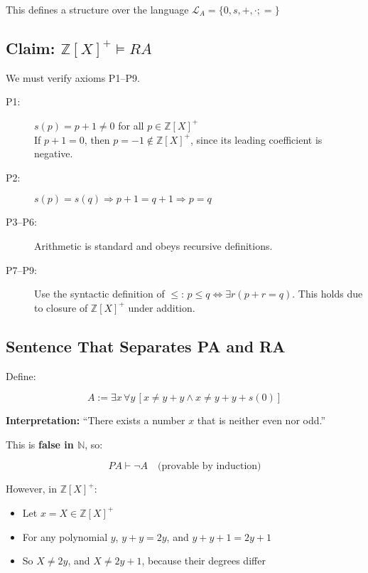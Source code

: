 \documentclass[12pt]{article}
\begin{document}
This defines a structure over the language \( \mathcal{L}_A = \{0, s, +, \cdot; =\} \)

\subsection{Claim: \( \mathbb{Z}[X]^+ \models RA \)}

We must verify axioms P1–P9.

\begin{description}
  \item[P1:] \( s(p) = p + 1 \neq 0 \) for all \( p \in \mathbb{Z}[X]^+ \) \\
  If \( p + 1 = 0 \), then \( p = -1 \notin \mathbb{Z}[X]^+ \), since its leading coefficient is negative.

  \item[P2:] \( s(p) = s(q) \Rightarrow p + 1 = q + 1 \Rightarrow p = q \)

  \item[P3–P6:] Arithmetic is standard and obeys recursive definitions.

  \item[P7–P9:] Use the syntactic definition of \( \leq \): \( p \leq q \iff \exists r(p + r = q) \). This holds due to closure of \( \mathbb{Z}[X]^+ \) under addition.
\end{description}

\subsection{Sentence That Separates PA and RA}

Define:

\[
A := \exists x\, \forall y\, [x \neq y + y \wedge x \neq y + y + s(0)]
\]

\textbf{Interpretation:} “There exists a number \( x \) that is neither even nor odd.”

This is \textbf{false in \( \mathbb{N} \)}, so:

\[
PA \vdash \neg A \quad \text{(provable by induction)}
\]

However, in \( \mathbb{Z}[X]^+ \):

\begin{itemize}
  \item Let \( x = X \in \mathbb{Z}[X]^+ \)
  \item For any polynomial \( y \), \( y + y = 2y \), and \( y + y + 1 = 2y + 1 \)
  \item So \( X \neq 2y \), and \( X \neq 2y + 1 \), because their degrees differ
\end{itemize}
\end{document}
